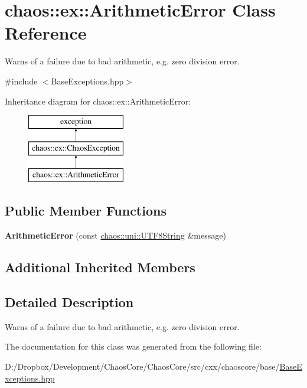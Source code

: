 \hypertarget{classchaos_1_1ex_1_1_arithmetic_error}{}\section{chaos\+:\+:ex\+:\+:Arithmetic\+Error Class Reference}
\label{classchaos_1_1ex_1_1_arithmetic_error}


Warns of a failure due to bad arithmetic, e.\+g. zero division error.  




{\ttfamily \#include $<$Base\+Exceptions.\+hpp$>$}

Inheritance diagram for chaos\+:\+:ex\+:\+:Arithmetic\+Error\+:\begin{figure}[H]
\begin{center}
\leavevmode
\includegraphics[height=3.000000cm]{classchaos_1_1ex_1_1_arithmetic_error}
\end{center}
\end{figure}
\subsection*{Public Member Functions}
\begin{DoxyCompactItemize}
\item 
\hypertarget{classchaos_1_1ex_1_1_arithmetic_error_a463d7850575f70f3d34d9db3300df29e}{}{\bfseries Arithmetic\+Error} (const \hyperlink{classchaos_1_1uni_1_1_u_t_f8_string}{chaos\+::uni\+::\+U\+T\+F8\+String} \&message)\label{classchaos_1_1ex_1_1_arithmetic_error_a463d7850575f70f3d34d9db3300df29e}

\end{DoxyCompactItemize}
\subsection*{Additional Inherited Members}


\subsection{Detailed Description}
Warns of a failure due to bad arithmetic, e.\+g. zero division error. 

The documentation for this class was generated from the following file\+:\begin{DoxyCompactItemize}
\item 
D\+:/\+Dropbox/\+Development/\+Chaos\+Core/\+Chaos\+Core/src/cxx/chaoscore/base/\hyperlink{_base_exceptions_8hpp}{Base\+Exceptions.\+hpp}\end{DoxyCompactItemize}
